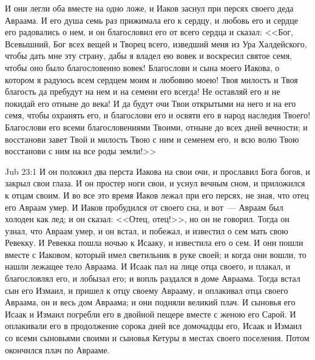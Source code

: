 И они легли оба вместе на одно ложе, и Иаков
заснул при персях своего деда Авраама. И его душа
семь раз прижимала его к сердцу, и любовь его и
сердце его радовались о нем, и он благословил его
от всего сердца и сказал: <<Бог, Всевышний, Бог
всех вещей и Творец всего, изведший меня из Ура
Халдейского, чтобы дать мне эту страну, дабы я
владел ею вовек и воскресил святое семя, чтобы
оно было благословенно вовек! Благослови и сына
моего Иакова, о котором я радуюсь всем сердцем
моим и любовию моею! Твоя милость и Твоя благость
да пребудут на нем и на семени его всегда! Не
оставляй его и не покидай его отныне до века! И да
будут очи Твои открытыми на него и на его семя,
чтобы охранять его, и благослови его и освяти его
в народ наследия Твоего! Благослови его всеми
благословениями Твоими, отныне до всех дней
вечности; и восстанови завет Твой и милость Твою
с ним и семенем его, и всю волю Твою восстанови с
ним на все роды земли!>>

\vs Jub 23:1
И он положил два перста Иакова на свои очи, и
прославил Бога богов, и закрыл свои глаза. И он
простер ноги свои, и уснул вечным сном, и
приложился к отцам своим. И во все это время Иаков
лежал при его персях, не зная, что отец его Авраам
умер. И Иаков пробудился от своего сна, и вот~---
Авраам был холоден как лед; и он сказал: <<Отец,
отец!>>, но он не говорил. Тогда он узнал, что
Авраам умер, и он встал, и побежал, и известил о
сем мать свою Ревекку. И Ревекка пошла ночью к
Исааку, и известила его о сем. И они пошли вместе с
Иаковом, который имел светильник в руке своей; и
когда они вошли, то нашли лежащее тело Авраама. И
Исаак пал на лице отца своего, и плакал, и
благословлял его, и лобызал его; и вопль раздался
в доме Авраама. Тогда встал сын его Измаил, и
пришел к отцу своему Аврааму, и оплакивал отца
своего Авраама, он и весь дом Авраама; и они
подняли великий плач. И сыновья его Исаак и
Измаил погребли его в двойной пещере вместе с
женою его Сарой. И оплакивали его в продолжение
сорока дней все домочадцы его, Исаак и Измаил со
всеми сыновьями своими и сыновья Кетуры в местах
своего поселения. Потом окончился плач по
Аврааме.

